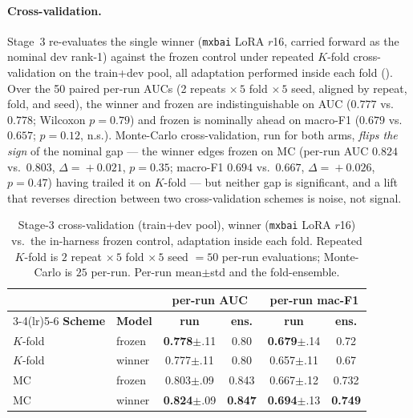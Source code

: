 \documentclass[conference]{IEEEtran}
\begin{document}
\paragraph{Cross-validation.} Stage~3 re-evaluates the single winner
(\texttt{mxbai} LoRA $r$16, carried forward as the nominal dev rank-1) against the
frozen control under repeated $K$-fold cross-validation on the train+dev pool, all
adaptation performed inside each fold (). Over the 50 paired
per-run AUCs (2 repeats $\times\,5$ fold $\times\,5$ seed, aligned by repeat, fold,
and seed), the winner and frozen are indistinguishable on AUC ($0.777$ vs.\ $0.778$;
Wilcoxon $p=0.79$) and frozen is nominally ahead on macro-F1 ($0.679$ vs.\ $0.657$;
$p=0.12$, n.s.). Monte-Carlo cross-validation, run for both arms,
\emph{flips the sign} of the nominal gap --- the winner
edges frozen on MC (per-run AUC $0.824$ vs.\ $0.803$, $\Delta\!=\!+0.021$,
$p=0.35$; macro-F1 $0.694$ vs.\ $0.667$, $\Delta\!=\!+0.026$, $p=0.47$) having
trailed it on $K$-fold --- but neither gap is significant, and a lift that
reverses direction between two cross-validation schemes is noise, not signal.

\begin{table}[t]
\caption{Stage-3 cross-validation (train+dev pool), winner (\texttt{mxbai} LoRA
$r$16) vs.\ the in-harness frozen control, adaptation inside each fold. Repeated
$K$-fold is $2$ repeat $\times\,5$ fold $\times\,5$ seed $=50$ per-run
evaluations; Monte-Carlo is $25$ per-run. Per-run mean$\pm$std and the
fold-ensemble.}
\label{tab:ft-cv}
\centering\small
\setlength{\tabcolsep}{4pt}
\begin{tabular}{@{}llcccc@{}}
\toprule
 & & \multicolumn{2}{c}{\textbf{per-run AUC}} & \multicolumn{2}{c}{\textbf{per-run mac-F1}} \\
\cmidrule(lr){3-4}\cmidrule(lr){5-6}
\textbf{Scheme} & \textbf{Model} & \textbf{run} & \textbf{ens.} & \textbf{run} & \textbf{ens.} \\
\midrule
$K$-fold & frozen        & \textbf{0.778}{\footnotesize$\pm$.11} & 0.80 & \textbf{0.679}{\footnotesize$\pm$.14} & 0.72 \\
$K$-fold & winner        & 0.777{\footnotesize$\pm$.11} & 0.80 & 0.657{\footnotesize$\pm$.11} & 0.67 \\
\midrule
MC       & frozen        & 0.803{\footnotesize$\pm$.09} & 0.843 & 0.667{\footnotesize$\pm$.12} & 0.732 \\
MC       & winner        & \textbf{0.824}{\footnotesize$\pm$.09} & \textbf{0.847} & \textbf{0.694}{\footnotesize$\pm$.13} & \textbf{0.749} \\
\bottomrule
\end{tabular}
\end{table}
\end{document}
